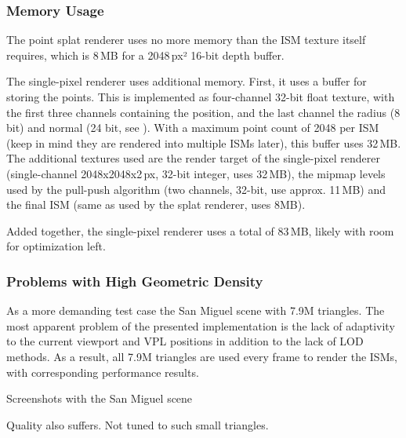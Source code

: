 

 \subsubsection{Memory Usage}

 The point splat renderer uses no more memory than the ISM texture itself requires, which is 8\,MB for a 2048\,px² 16-bit depth buffer.

 The single-pixel renderer uses additional memory. First, it uses a buffer for storing the points. This is implemented as four-channel 32-bit float texture, with the first three channels containing the position, and the last channel the radius (8 bit) and normal (24 bit, see \cite{Cigolle:2014:NormalPacking}). With a maximum point count of 2048 per ISM (keep in mind they are rendered into multiple ISMs later), this buffer uses 32\,MB.
 The additional textures used are the render target of the single-pixel renderer (single-channel 2048x2048x2\,px, 32-bit integer, uses 32\,MB), the mipmap levels used by the pull-push algorithm (two channels, 32-bit, use approx. 11\,MB) and the final ISM (same as used by the splat renderer, uses 8MB).

 Added together, the single-pixel renderer uses a total of 83\,MB, likely with room for optimization left.


 \subsubsection{Problems with High Geometric Density}

 As a more demanding test case the San Miguel scene with 7.9M triangles. The most apparent problem of the presented implementation is the lack of adaptivity to the current viewport and VPL positions in addition to the lack of LOD methods. As a result, all 7.9M triangles are used every frame to render the ISMs, with corresponding performance results.

 Screenshots with the San Miguel scene

 Quality also suffers. Not tuned to such small triangles.

